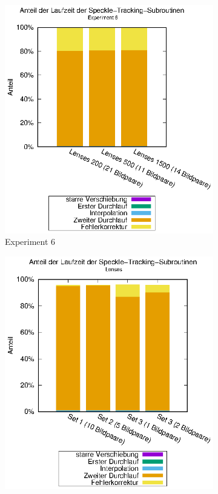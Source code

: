 \begin{center}
	\begin{figure}[htbp]
		\begin{subfigure}[b]{0.5\textwidth}
			\centering
			\includegraphics[width=\textwidth]{pdf/speckle_exp6}
			\caption{Experiment 6}
			\label{fig:perc_speckle_exp6}
		\end{subfigure}
		\begin{subfigure}[b]{0.5\textwidth}
			\centering
			\includegraphics[width=\textwidth]{pdf/speckle_lenses}

\end{subfigure}
\end{figure}
\end{center}
